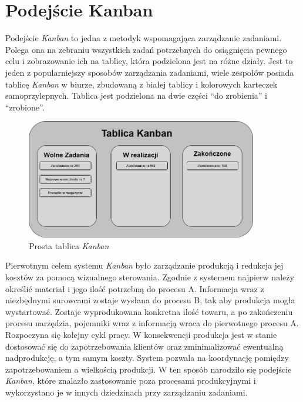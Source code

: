 \section{Podejście Kanban}

\indent 
Podejście \textit{Kanban} to jedna z metodyk wspomagająca zarządzanie zadaniami. Polega ona na zebraniu wszystkich zadań potrzebnych do osiągnięcia pewnego celu i zobrazowanie ich na tablicy, która podzielona jest na różne działy. Jest to jeden z popularniejszy sposobów zarządzania zadaniami, wiele zespołów posiada tablicę \textit{Kanban} w biurze, zbudowaną z białej tablicy i kolorowych karteczek samoprzylepnych. Tablica jest podzielona na dwie części “do zrobienia” i “zrobione”.
\begin{figure}[h]
	
	\centering
	\includegraphics[width=0.90\textwidth]{tablica_kanban}		
	\caption{Prosta tablica \textit{Kanban}}
\end{figure}


Pierwotnym celem systemu \textit{Kanban} było zarządzanie produkcją i redukcja jej kosztów za pomocą wizualnego sterowania. Zgodnie z systemem najpierw należy określić materiał i jego ilość potrzebną do procesu A. Informacja wraz z niezbędnymi surowcami zostaje wysłana do procesu B, tak aby produkcja mogła wystartować. Zostaje wyprodukowana konkretna ilość towaru, a po zakończeniu procesu narzędzia, pojemniki wraz z informacją wraca do pierwotnego procesu A. Rozpoczyna  się kolejny cykl pracy. W konsekwencji produkcja jest w stanie dostosować się do zapotrzebowania klientów oraz zminimalizować ewentualną nadprodukcję, a tym samym koszty. System pozwala na koordynację pomiędzy zapotrzebowaniem a wielkością produkcji. W ten sposób narodziło się podejście \textit{Kanban}, które znalazło zastosowanie poza procesami produkcyjnymi i wykorzystano je w innych dziedzinach przy zarządzaniu zadaniami.

